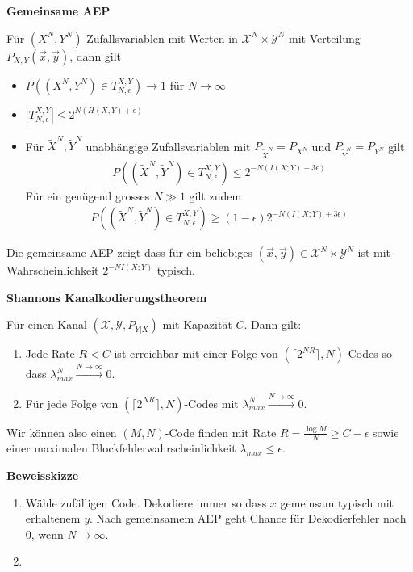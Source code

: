 \documentclass[25pt]{sciposter}
\newenvironment{thm}[1]{\begin{mdframed}[nobreak=true,backgroundcolor=Emerald!10,innertopmargin=15pt, innerbottommargin=15pt]
		\textbf{#1 }
	}
	{ 
	\end{mdframed}
}
\newcommand{\TODO}[1]{\todo[inline]{\Large TODO:  #1}}
\begin{document}
\begin{multicols}{3}
\begin{thm}{Gemeinsame AEP}
	Für $(X^N, Y^N)$ Zufallsvariablen mit Werten in $\mathcal{X}^N \times \mathcal{Y}^N$ mit Verteilung $P_{X,Y}(\vec{x},\vec{y})$, dann gilt
	\begin{itemize}
		\item $P((X^N, Y^N) \in T_{N,\epsilon}^{X,Y}) \to 1$ für $N \to \infty$
		\item $|T_{N,\epsilon}^{X,Y}| \leq 2^{N(H(X,Y) + \epsilon)}$
		\item Für $\tilde{X}^N, \tilde{Y}^N$ unabhängige Zufallsvariablen mit $P_{\tilde{X}^N} = P_{X^N}$ und  $P_{\tilde{Y}^N} = P_{Y^N}$ gilt
		\begin{align*}
P((\tilde{X}^N, \tilde{Y}^N) \in T_{N,\epsilon}^{X,Y}) \leq 2^{-N(I(X;Y)-3\epsilon)}
		\end{align*}
		Für ein genügend grosses $N\gg 1$ gilt zudem
		\begin{align*}
					P((\tilde{X}^N, \tilde{Y}^N) \in T_{N,\epsilon}^{X,Y}) \geq (1-\epsilon) 2^{-N(I(X;Y) + 3 \epsilon)}
		\end{align*} 
	\end{itemize}
\end{thm}

Die gemeinsame AEP zeigt dass für ein beliebiges $(\vec{x}, \vec{y})\in \mathcal{X}^N\times \mathcal{Y}^N$ ist mit Wahrscheinlichkeit $2^{-NI(X;Y)}$ typisch.


\begin{thm}{Shannons Kanalkodierungstheorem}
	Für einen Kanal $(\mathcal{X},\mathcal{Y},P_{Y|X})$ mit Kapazität $C$.  Dann gilt:\begin{enumerate}
		\item Jede Rate $R < C$ ist erreichbar mit einer Folge von $(\lceil2^{NR}\rceil,N)$-Codes so dass $\lambda_{max}^{N} \stackrel{N\to \infty}{\longrightarrow} 0$.
		\item Für jede Folge von $(\lceil2^{NR}\rceil,N)$-Codes mit $\lambda_{max}^{N} \stackrel{N\to \infty}{\longrightarrow} 0$.
	\end{enumerate}
\end{thm}

Wir können also einen $(M,N)$-Code finden mit Rate $R = \frac{\log M }{N} \geq C-\epsilon$ sowie einer maximalen Blockfehlerwahrscheinlichkeit $\lambda_{max}\leq \epsilon$.

\textbf{Beweisskizze}
\begin{enumerate}
\item Wähle zufälligen Code. Dekodiere immer so dass $x$ gemeinsam typisch mit erhaltenem $y$. Nach gemeinsamem AEP geht Chance für Dekodierfehler nach 0, wenn $N \to \infty$.
\item \TODO{todo}
\end{enumerate}


\end{multicols}
\end{document}
